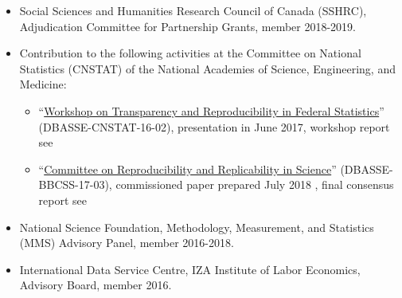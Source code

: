 \documentclass[10pt,letterpaper]{report}
\begin{document}
\begin{itemize}
\begin{itemize}
\end{itemize} 
\item Social Sciences and Humanities Research Council of Canada (SSHRC), Adjudication Committee for Partnership Grants, member 2018-2019.
\item Contribution to the following activities at the Committee on National Statistics (CNSTAT) of the National Academies of Science, Engineering, and Medicine:
\begin{itemize}
	\item ``\href{https://www8.nationalacademies.org/pa/projectview.aspx?key=49809}{Workshop on Transparency and Reproducibility in Federal Statistics}'' (DBASSE-CNSTAT-16-02), presentation in June 2017, workshop report see \cite{NAP25305}
	\item ``\href{https://www8.nationalacademies.org/pa/projectview.aspx?key=49906}{Committee on Reproducibility and Replicability in Science}'' (DBASSE-BBCSS-17-03), commissioned paper prepared July 2018 \parencite{vilhuber2018nap}, final consensus report see \cite{NAP25303}
\end{itemize}
\item National Science Foundation, Methodology, Measurement, and Statistics (MMS) Advisory Panel, member 2016-2018.
\item International Data Service Centre, IZA Institute of Labor Economics, Advisory Board, member 2016.
\end{itemize}

  
\end{document}
